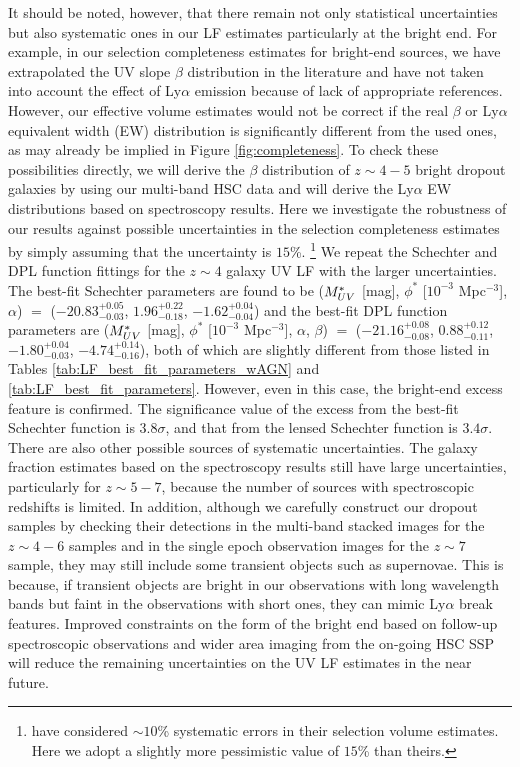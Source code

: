 \documentclass[]{pasj01}
\begin{document}
It should be noted, however, that 
there remain not only statistical uncertainties but also systematic ones 
in our LF estimates particularly at the bright end. 
%
For example, 
in our selection completeness estimates for bright-end sources, 
we have extrapolated the UV slope $\beta$ distribution in the literature 
and have not taken into account the effect of Ly$\alpha$ emission
because of lack of appropriate references. 
However, our effective volume estimates would not 
be 
correct 
if the real $\beta$ or Ly$\alpha$ equivalent width (EW) distribution is 
significantly different from the used ones, 
as may already be implied in Figure \ref{fig:completeness}. 
To check these possibilities directly, 
we will derive the $\beta$ distribution of $z \sim 4-5$ 
bright dropout galaxies by using our multi-band HSC data 
and will derive the Ly$\alpha$ EW distributions based on spectroscopy results. 
%
Here we investigate the robustness of our results against possible uncertainties 
in the selection completeness estimates  
by simply assuming that the uncertainty is $15${\%}.
\footnote{
\citet{2015ApJ...803...34B} have considered 
$\sim 10${\%} systematic errors in their
selection volume estimates. 
Here we adopt a slightly more pessimistic value of $15${\%} than theirs.}
We repeat
the Schechter and DPL function fittings 
for the $z \sim 4$ galaxy UV LF with the larger uncertainties. 
The best-fit Schechter parameters are found to be 
($M_{\rm UV}^\ast$ [mag], $\phi^\ast$ [$10^{-3}$ Mpc$^{-3}$], $\alpha$) 
$=$ 
($-20.83^{+0.05}_{-0.03}$, $1.96^{+0.22}_{-0.18}$, $-1.62^{+0.04}_{-0.04}$) 
and the best-fit DPL function parameters are 
($M_{\rm UV}^\ast$ [mag], $\phi^\ast$ [$10^{-3}$ Mpc$^{-3}$], $\alpha$, $\beta$) 
$=$ 
($-21.16^{+0.08}_{-0.08}$, $0.88^{+0.12}_{-0.11}$, $-1.80^{+0.04}_{-0.03}$, $-4.74^{+0.14}_{-0.16}$), 
both of which are slightly different from those listed 
in Tables  \ref{tab:LF_best_fit_parameters_wAGN} and \ref{tab:LF_best_fit_parameters}. 
However, even in this case, the bright-end excess feature is confirmed. 
The significance value of the excess from the best-fit Schechter function is 
$3.8 \sigma$, 
and that from the lensed Schechter function is 
$3.4 \sigma$. 
%
There are also other possible sources of systematic uncertainties.  
The galaxy fraction estimates based on the spectroscopy results 
still have large uncertainties, particularly for $z \sim 5-7$, 
because the number of sources with spectroscopic redshifts is limited. 
%
In addition, 
although we carefully construct our dropout samples 
by checking their detections in the multi-band stacked images for the $z \sim 4-6$ samples 
and in the single epoch observation images for the $z \sim 7$ sample, 
they may still include some transient objects such as supernovae. 
This is because, 
if transient objects are bright in our observations with long wavelength bands 
but faint in the observations with short ones, 
they can mimic Ly$\alpha$ break features. 
%
Improved constraints on the form of the bright end 
based on follow-up spectroscopic observations 
and wider area imaging from the on-going HSC SSP 
will reduce the remaining uncertainties 
on the UV LF estimates in the near future.  
\end{document}
